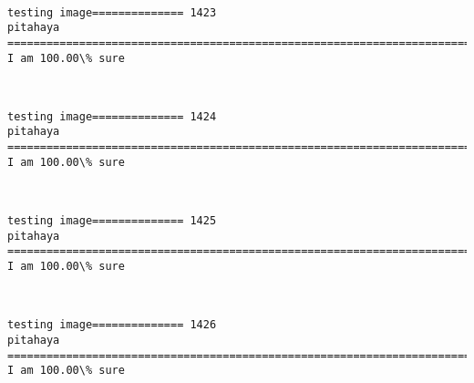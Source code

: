 \documentclass[11pt]{article}
\begin{document}
    \begin{center}
    \end{center}
    { \hspace*{\fill} \\}
    
    \begin{Verbatim}[commandchars=\\\{\}]
testing image============== 1423
pitahaya
============================================================================
I am 100.00\% sure

    \end{Verbatim}

    \begin{center}
    \end{center}
    { \hspace*{\fill} \\}
    
    \begin{Verbatim}[commandchars=\\\{\}]
testing image============== 1424
pitahaya
============================================================================
I am 100.00\% sure

    \end{Verbatim}

    \begin{center}
    \end{center}
    { \hspace*{\fill} \\}
    
    \begin{Verbatim}[commandchars=\\\{\}]
testing image============== 1425
pitahaya
============================================================================
I am 100.00\% sure

    \end{Verbatim}

    \begin{center}
    \end{center}
    { \hspace*{\fill} \\}
    
    \begin{Verbatim}[commandchars=\\\{\}]
testing image============== 1426
pitahaya
============================================================================
I am 100.00\% sure

    \end{Verbatim}
\end{document}
